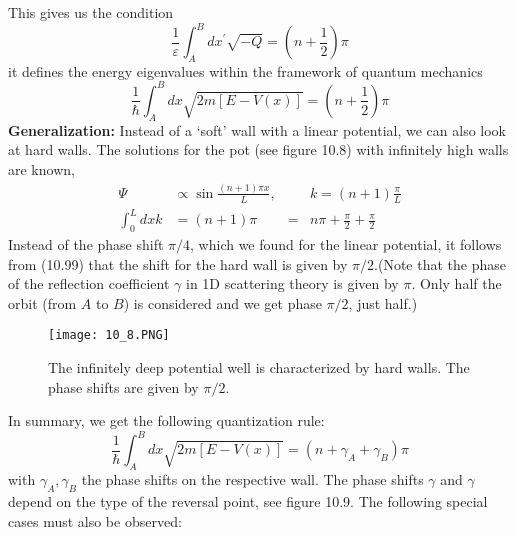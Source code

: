 This gives us the condition
\begin{equation}
    \frac{1}{\varepsilon} \int_{A}^{B} d x^{\prime} \sqrt{-Q}=\left(n+\frac{1}{2}\right) \pi
    \end{equation}
it defines the energy eigenvalues ​​within the framework of quantum mechanics
\begin{equation}
    \frac{1}{\hbar} \int_{A}^{B} d x \sqrt{2 m[E-V(x)]}=\left(n+\frac{1}{2}\right) \pi
    \end{equation}
\textbf{Generalization:} Instead of a `soft' wall with a linear potential, we can also look at hard walls. The solutions for the pot (see figure 10.8) with infinitely high walls are known,
\begin{equation}
\begin{aligned} \Psi & \propto \sin \frac{(n+1) \pi x}{L}, & & k=(n+1) \frac{\pi}{L} \\ \int_{0}^{L} d x k &=(n+1) \pi &=& n \pi+\frac{\pi}{2}+\frac{\pi}{2} \end{aligned}
\end{equation}
Instead of the phase shift $\pi / 4$, which we found for the linear potential, it follows from (10.99) that the shift for the hard wall is given by $\pi / 2$.(Note that the phase of the reflection coefficient $\gamma$ in 1D scattering theory is given by $\pi$. Only half the orbit (from $A$ to $B$) is considered and we get phase $\pi / 2$, just half.)
\begin{figure}[ht]
    \begin{minipage}{0.5\textwidth}
        \centering
        \texttt{[image: 10\_8.PNG]}
    \end{minipage}
    \begin{minipage}{0.5\textwidth}
        \caption{The infinitely deep potential well is characterized by hard walls. The phase shifts are given by $\pi / 2$.}
    \end{minipage}
\end{figure}
In summary, we get the following quantization rule:
\begin{equation}
    \frac{1}{\hbar} \int_{A}^{B} d x \sqrt{2 m[E-V(x)]}=\left(n+\gamma_{A}+\gamma_{B}\right) \pi
    \end{equation}
with $\gamma_A,\gamma_B$ the phase shifts on the respective wall. The phase shifts $\gamma$ and $\gamma$ depend on the type of the reversal point, see figure 10.9. The following special cases must also be observed:\par
